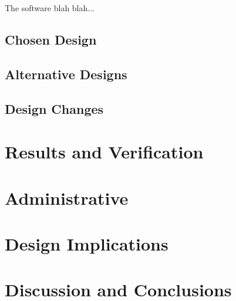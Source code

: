 \documentclass[12pt,letterpaper]{article}
\begin{document}
The software blah blah...

\subsection{Chosen Design}
\subsection{Alternative Designs}
\subsection{Design Changes}

\section{Results and Verification}
\section{Administrative}
\section{Design Implications}
\section{Discussion and Conclusions}
\end{document}
